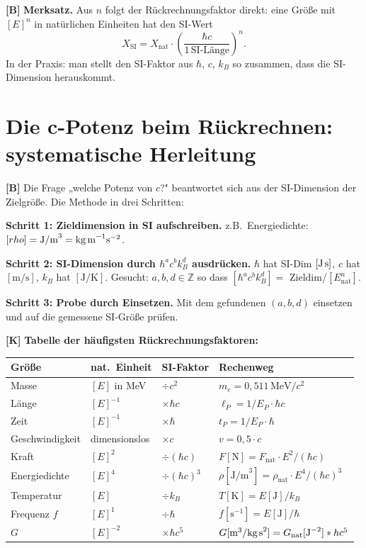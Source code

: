 \textbf{[B]} \textbf{Merksatz.} Aus $n$ folgt der Rückrechnungsfaktor direkt:
eine Größe mit $[E]^n$ in natürlichen Einheiten hat den SI-Wert
\[
  X_\text{SI} = X_\text{nat}\cdot\left(\frac{\hbar c}{1\,\text{SI-Länge}}\right)^n.
\]
In der Praxis: man stellt den SI-Faktor aus $\hbar$, $c$, $k_B$ so zusammen,
dass die SI-Dimension herauskommt.

\section{Die c-Potenz beim Rückrechnen: systematische Herleitung}

\textbf{[B]} Die Frage „welche Potenz von $c$?" beantwortet sich aus der
SI-Dimension der Zielgröße. Die Methode in drei Schritten:

\textbf{Schritt 1: Zieldimension in SI aufschreiben.}
z.B.\ Energiedichte: $[\rho]=\text{J/m}^3=\text{kg\,m}^{-1}\text{s}^{-2}$.

\textbf{Schritt 2: SI-Dimension durch $\hbar^a c^b k_B^d$ ausdrücken.}
$\hbar$ hat SI-Dim $[\text{J\,s}]$, $c$ hat $[\text{m/s}]$, $k_B$ hat $[\text{J/K}]$.
Gesucht: $a,b,d\in\mathbb Z$ so dass $[\hbar^a c^b k_B^d]=$ Zieldim/$[E_\text{nat}^n]$.

\textbf{Schritt 3: Probe durch Einsetzen.}
Mit dem gefundenen $(a,b,d)$ einsetzen und auf die gemessene SI-Größe prüfen.

\textbf{[K]} \textbf{Tabelle der häufigsten Rückrechnungsfaktoren:}

\begin{center}
\renewcommand{\arraystretch}{1.35}
{\small\setlength\tabcolsep{4pt}
\begin{tabular}{lllp{4.5cm}}
\toprule
Größe & nat.\ Einheit & SI-Faktor & Rechenweg \\
\midrule
Masse & $[E]$ in MeV & $\div c^2$ & $m_e=0{,}511\,\text{MeV}/c^2$ \\
Länge & $[E]^{-1}$ & $\times\hbar c$ & $\ell_P=1/E_P\cdot\hbar c$ \\
Zeit & $[E]^{-1}$ & $\times\hbar$ & $t_P=1/E_P\cdot\hbar$ \\
Geschwindigkeit & dimensionslos & $\times c$ & $v=0{,}5\cdot c$ \\
Kraft & $[E]^2$ & $\div(\hbar c)$ & $F[\text{N}]=F_\text{nat}\cdot E^2/(\hbar c)$ \\
Energiedichte & $[E]^4$ & $\div(\hbar c)^3$ & $\rho[\text{J/m}^3]=\rho_\text{nat}\cdot E^4/(\hbar c)^3$ \\
Temperatur & $[E]$ & $\div k_B$ & $T[\text{K}]=E[\text{J}]/k_B$ \\
Frequenz $f$ & $[E]^1$ & $\div\hbar$ & $f[\text{s}^{-1}]=E[\text{J}]/\hbar$ \\
$G$ & $[E]^{-2}$ & $\times\hbar c^5$ & $G[\text{m}^3/\text{kg\,s}^2]=G_\text{nat}[\text{J}^{-2}]\cdot\hbar c^5$ \\
\bottomrule
\end{tabular}
}
\renewcommand{\arraystretch}{1.0}
\end{center}

